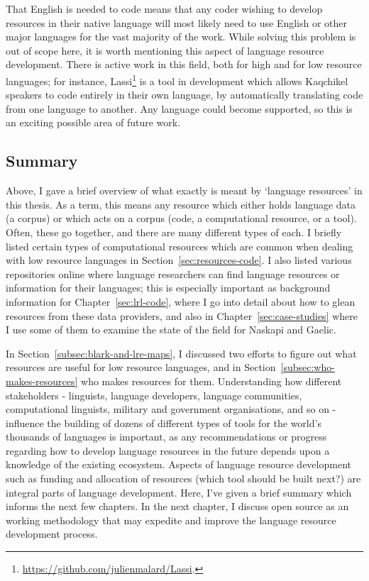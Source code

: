 That English is needed to code means that any coder wishing to develop resources in their native language will most likely need to use English or other major languages for the vast majority of the work. While solving this problem is out of scope here, it is worth mentioning this aspect of language resource development. There is active work in this field, both for high and for low resource languages; for instance, Lassi\footnote{\href{https://github.com/julienmalard/Lassi}{https://github.com/julienmalard/Lassi}. } is a tool in development which allows Kaqchikel speakers to code entirely in their own language, by automatically translating code from one language to another. Any language could become supported, so this is an exciting possible area of future work.

\subsection{Summary}


Above, I gave a brief overview of what exactly is meant by `language resources' in this thesis. As a term, this means any resource which either holds language data (a corpus) or which acts on a corpus (code, a computational resource, or a tool). Often, these go together, and there are many different types of each. I briefly listed certain types of computational resources which are common when dealing with low resource languages in Section~\ref{sec:resources-code}. I also listed various repositories online where language researchers can find language resources or information for their languages; this is especially important as background information for Chapter~\ref{sec:lrl-code}, where I go into detail about how to glean resources from these data providers, and also in Chapter~\ref{sec:case-studies} where I use some of them to examine the state of the field for Naskapi and Gaelic.

In Section~\ref{subsec:blark-and-lre-maps}, I discussed two efforts to figure out what resources are useful for low resource languages, and in Section~\ref{subsec:who-makes-resources} who makes resources for them. Understanding how different stakeholders - linguists, language developers, language communities, computational linguists, military and government organisations, and so on - influence the building of dozens of different types of tools for the world's thousands of languages is important, as any recommendations or progress regarding how to develop language resources in the future depends upon a knowledge of the existing ecosystem. Aspects of language resource development such as funding and allocation of resources (which tool should be built next?) are integral parts of language development. Here, I've given a brief summary which informs the next few chapters. In the next chapter, I discuss open source as an working methodology that may expedite and improve the language resource development process. 
